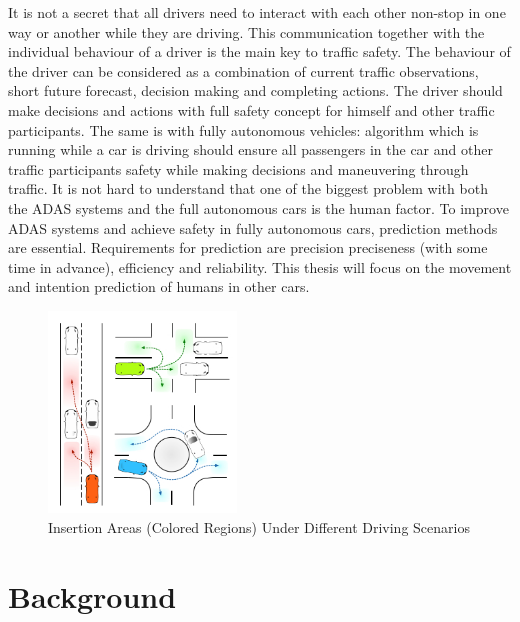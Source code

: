 It is not a secret that all drivers need to interact with each other non-stop in one way or another while they are driving. This communication together with the individual behaviour of a driver is the main key to traffic safety. The behaviour of the driver can be considered as a combination of current traffic observations, short future forecast, decision making and completing actions. The driver should make decisions and actions with full safety concept for himself and other traffic participants. The same is with fully autonomous vehicles: algorithm which is running while a car is driving should ensure all passengers in the car and other traffic participants safety while making decisions and maneuvering through traffic. It is not hard to understand that one of the biggest problem with both the \gls{ADAS} systems and the full autonomous cars is the human factor. To improve \gls{ADAS} systems and achieve safety in fully autonomous cars, prediction methods are essential. Requirements for prediction are precision preciseness (with some time in advance), efficiency and reliability. This thesis will focus on the movement and intention prediction of humans in other cars.

\begin{figure}[h]
	\centering  	
	\includegraphics[width=5cm]{img/4.jpg}
	\caption{Insertion Areas (Colored Regions) Under Different Driving Scenarios \cite{pic}}
	\label{fig:intersectionAreas}    
\end{figure}

\section{Background}

